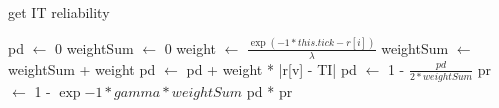 \begin{algorithm}[H]
\caption{get IT reliability}
\begin{algorithmic} 
\STATE pd $\leftarrow$ 0
\STATE weightSum $\leftarrow$ 0
\STATE weight $\leftarrow$ $\frac{\exp{ (-1*this.tick-r[i]) }}{\lambda}$
\STATE weightSum $\leftarrow$ weightSum + weight
\STATE pd $\leftarrow$ pd + weight * |r[v] - TI|
\ENDFOR
\STATE pd $\leftarrow$ 1 - $\frac{pd}{2 * weightSum}$
\STATE pr $\leftarrow$ 1 - $\exp{-1 * gamma * weightSum}$
\RETURN pd * pr
\end{algorithmic}
\end{algorithm}
	